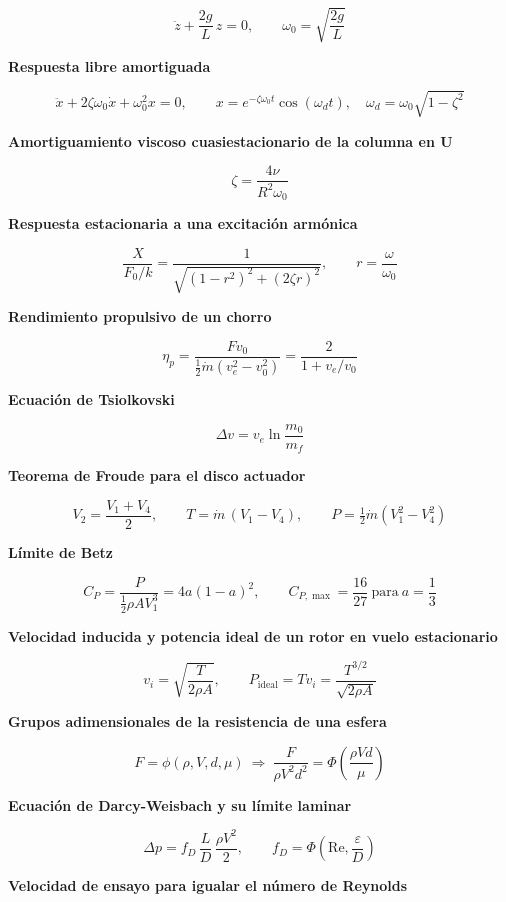 \documentclass[10pt,openany]{book}
\begin{document}
\[
\ddot z + \frac{2g}{L}\,z = 0,\qquad \omega_0 = \sqrt{\frac{2g}{L}}
\]

\noindent\textbf{Respuesta libre amortiguada}

\[
\ddot x + 2\zeta\omega_0\dot x + \omega_0^{2}x = 0,\qquad x = e^{-\zeta\omega_0 t}\cos(\omega_d t),\quad \omega_d = \omega_0\sqrt{1 - \zeta^{2}}
\]

\noindent\textbf{Amortiguamiento viscoso cuasiestacionario de la columna en U}

\[
\zeta = \frac{4\nu}{R^{2}\omega_0}
\]

\noindent\textbf{Respuesta estacionaria a una excitación armónica}

\[
\frac{X}{F_0/k} = \frac{1}{\sqrt{\left(1 - r^{2}\right)^{2} + \left(2\zeta r\right)^{2}}},\qquad r = \frac{\omega}{\omega_0}
\]

\noindent\textbf{Rendimiento propulsivo de un chorro}

\[
\eta_p = \frac{F v_0}{\tfrac12\dot m\left(v_e^{2} - v_0^{2}\right)} = \frac{2}{1 + v_e/v_0}
\]

\noindent\textbf{Ecuación de Tsiolkovski}

\[
\Delta v = v_e\ln\frac{m_0}{m_f}
\]

\noindent\textbf{Teorema de Froude para el disco actuador}

\[
V_2 = \frac{V_1 + V_4}{2},\qquad T = \dot m\,(V_1 - V_4),\qquad P = \tfrac12\dot m\left(V_1^{2} - V_4^{2}\right)
\]

\noindent\textbf{Límite de Betz}

\[
C_P = \frac{P}{\tfrac12\rho A V_1^{3}} = 4a(1 - a)^{2},\qquad C_{P,\max} = \frac{16}{27}\ \text{para}\ a = \frac13
\]

\noindent\textbf{Velocidad inducida y potencia ideal de un rotor en vuelo estacionario}

\[
v_i = \sqrt{\frac{T}{2\rho A}},\qquad P_{\mathrm{ideal}} = T v_i = \frac{T^{3/2}}{\sqrt{2\rho A}}
\]

\noindent\textbf{Grupos adimensionales de la resistencia de una esfera}

\[
F = \phi(\rho, V, d, \mu)\ \Rightarrow\ \frac{F}{\rho V^{2} d^{2}} = \Phi\!\left(\frac{\rho V d}{\mu}\right)
\]

\noindent\textbf{Ecuación de Darcy-Weisbach y su límite laminar}

\[
\Delta p = f_D\,\frac{L}{D}\,\frac{\rho V^{2}}{2},\qquad f_D = \Phi\!\left(\mathrm{Re}, \frac{\varepsilon}{D}\right)
\]

\noindent\textbf{Velocidad de ensayo para igualar el número de Reynolds}
\end{document}
